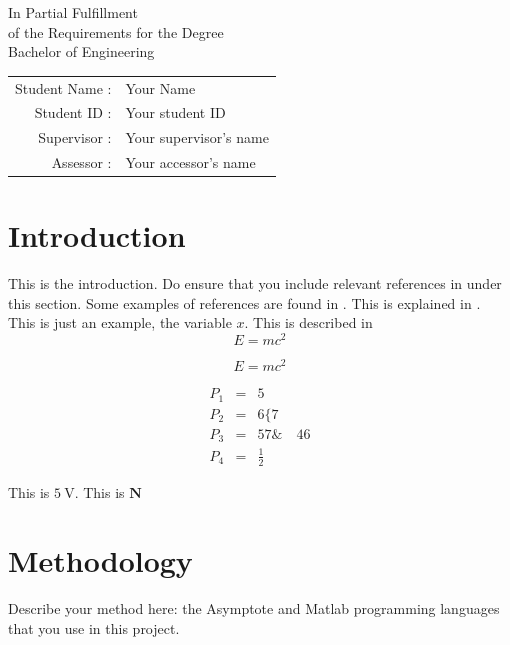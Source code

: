 \documentclass[12pt,a4paper]{report}
\begin{document}
\begin{titlepage}
  \begin{center}
  \begin{large}
  In Partial Fulfillment\\
  of the Requirements for the Degree\\
  Bachelor of Engineering\\
   \vspace{3.0cm}
     \begin{tabular}{r@{ }l} 
       Student Name : & Your Name\\ 
       Student ID : & Your student ID\\ 
       Supervisor : &  Your supervisor's name\\ 
       Assessor : & Your accessor's name \\
    \end{tabular}
  \end{large}
  \end{center}
\clearpage
\end{titlepage}


\tableofcontents


\quad 
\setcounter{page}{1}
\chapter{Introduction}
This is the introduction.  Do ensure that you include relevant references in under this section.  Some examples of references are found in \cite{ting2013resource,jayaprakasam2013pareto}. This is explained in \cite{ting2013resource, jayaprakasam2013genetic,jayaprakasam2013pareto}.  This is just an example, the variable $x$. This is described in
\begin{equation}
	E=mc^2 \nonumber
\end{equation}

\[
E=mc^2
\]

\begin{eqnarray}
	P_1 &=& 5 \\
	P_2 &=& 6 \{ 7 \nonumber\\
	P_3 &=& 57               \& \quad 46\\
	P_4 &=& \frac{1}{2}
\end{eqnarray}

This is $5\:$V.  This is $\mathbf{N}$


\chapter{Methodology} 
Describe your method here: the Asymptote and Matlab programming languages that you use in this project.
\end{document}

